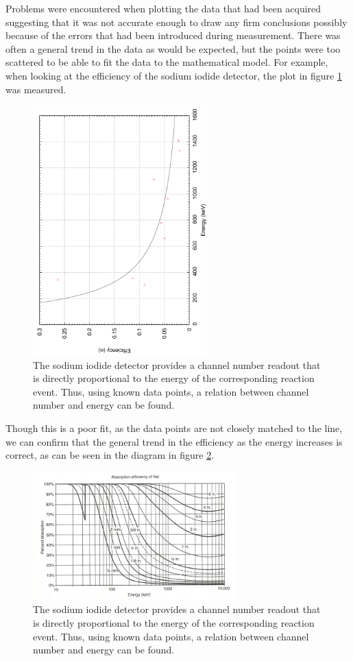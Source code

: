 Problems were encountered when plotting the data that had been acquired suggesting that it was not accurate enough to draw any firm conclusions possibly because of the errors that had been introduced during measurement. There was often a general trend in the data as would be expected, but the points were too scattered to be able to fit the data to the mathematical model. For example, when looking at the efficiency of the sodium iodide detector, the plot in figure \ref{fig:NaIefficiancy} was measured.
\begin{figure}[ht]
	\centering
	\includegraphics[angle=270,width=0.6\textwidth]{NaIEfficiency.pdf}
	\caption{The sodium iodide detector provides a channel number readout that is directly proportional to the energy of the corresponding reaction event. Thus, using known data points, a relation between channel number and energy can be found.\label{fig:NaIefficiancy}}
\end{figure}
Though this is a poor fit, as the data points are not closely matched to the line, we can confirm that the general trend in the efficiency as the energy increases is correct, as can be seen in the diagram in figure \ref{fig:efficiencyKrane}\cite{krane}.
\begin{figure}[ht]
	\centering
	\includegraphics[width=0.7\textwidth]{EfficiencyKrane.pdf}
	\caption{The sodium iodide detector provides a channel number readout that is directly proportional to the energy of the corresponding reaction event. Thus, using known data points, a relation between channel number and energy can be found.\label{fig:efficiencyKrane}}
\end{figure}

